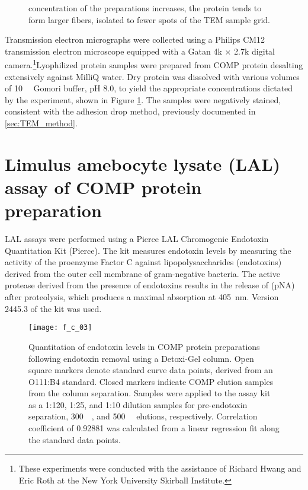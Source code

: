 \begin{refsection}
\begin{figure}
{concentration of the preparations increases, the protein tends to form larger
fibers, isolated to fewer spots of the TEM sample grid.}\label{fig:COMP_EM_3}
\end{figure}
Transmission electron micrographs were collected using a Philips CM12
transmission electron microscope equipped with a Gatan 4k ${\times}$ 2.7k
digital camera.\footnote{These experiments were conducted with the assistance of
Richard Hwang and Eric Roth at the New York University Skirball Institute.}Lyophilized protein samples were prepared from COMP protein
desalting extensively against MilliQ water. Dry protein was dissolved with
various volumes of \SI{10}{\milli\moLar} Gomori buffer, pH 8.0, to yield the
appropriate concentrations dictated by the experiment, shown in Figure
\ref{fig:COMP_EM_3}. The samples were negatively stained, consistent with
the adhesion drop method, previously documented in \ref{sec:TEM_method}. 

\section{Limulus amebocyte lysate (LAL) assay of COMP protein preparation}
\label{sec:lal_assay}
LAL assays were performed using a Pierce LAL Chromogenic Endotoxin Quantitation
Kit (Pierce). The kit measures endotoxin levels by measuring the activity of the
proenzyme Factor C against lipopolysaccharides (endotoxins) derived from the
outer cell membrane of gram-negative bacteria. The active protease derived from
the presence of endotoxins results in the release of 
(pNA) after proteolysis, which produces a maximal absorption at \SI{405}{\nm}.
Version 2445.3 of the kit was used.
\begin{figure}[h!] \centering \texttt{[image: f\_c\_03]}
    \caption{Quantitation of endotoxin levels in COMP protein preparations
        following endotoxin removal using a Detoxi-Gel column. Open square
        markers denote standard curve data points, derived from an
         O111:B4 standard. Closed markers indicate COMP elution
        samples from the column separation. Samples were applied to the assay
        kit as a 1:120, 1:25, and 1:10 dilution samples for pre-endotoxin
        separation, \SI{300}{\milli\moLar}, and \SI{500}{\milli\moLar} elutions,
    respectively. Correlation coefficient of 0.92881 was calculated from a
linear regression fit along the standard data points.}\label{fig:LAL_assay}
\end{figure}

\end{refsection}
